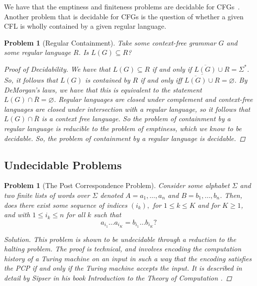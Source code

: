 \documentclass[psamsfonts]{amsart}
\newtheorem{prob}[thm]{Problem}
\theoremstyle{definition}
\theoremstyle{remark}
\numberwithin{equation}{section}
\begin{document}
We have that the emptiness and finiteness problems are decidable for
\acp{CFG}~\cite{hopcroft07:_introd_autom_theor_languag_comput,
  sipser13:_introd_theor_comput}. Another problem that is decidable for
\acp{CFG} is the question of whether a given \ac{CFL} is wholly contained by a
given regular language.

\begin{prob}[Regular Containment]
Take some context-free grammar $G$ and some regular language $R$. Is
$L(G)\subseteq R$?
\begin{proof}[Proof of Decidability]
  We have that $L(G)\subseteq R$ if and only if
  $\overline{L(G)}\cup R = \Sigma^*$. So, it follows that $L(G)$ is contained by
  $R$ if and only iff $\overline{\overline{L(G)}\cup R} = \varnothing$. By
  DeMorgan's laws, we have that this is equivalent to the statement
  $L(G)\cap \overline{R} = \varnothing$. Regular languages are closed under
  complement and context-free languages are closed under intersection with a
  regular language, so it follows that $L(G)\cap \overline{R}$ is a context free
  language. So the problem of containment by a regular language is reducible to
  the problem of emptiness, which we know to be
  decidable. So, the problem of containment by a regular language is decidable.
\end{proof}

\end{prob}

\subsection{Undecidable Problems}
\begin{prob}[The Post Correspondence Problem]
  \label{prob:pcp}
  Consider some alphabet $\Sigma$ and two finite lists of words over $\Sigma$
  denoted $A = a_1,\dots,a_n$ and $B = b_1, \dots, b_n$. Then, does there exist
some sequence of indices $(i_k),$ for $1 \leq k \leq K$ and for
  $K\geq 1$, and with $1 \leq i_k \leq n$ for all $k$ such that
  \[
    a_{i_1}\dots a_{i_K} = b_{i_1}\dots b_{i_K}?
  \]
  \begin{proof}[Solution]
    This problem is shown to be undecidable through a reduction to the halting
    problem. The proof is technical, and involves encoding the computation
    history of a Turing machine on an input in such a way that the encoding satisfies the
    PCP if and only if the Turing machine accepts the input. It is described in
    detail by Sipser in his book \emph{Introduction to the Theory of Computation}
    \cite{sipser13:_introd_theor_comput}.
  \end{proof}
\end{prob}
\end{document}
